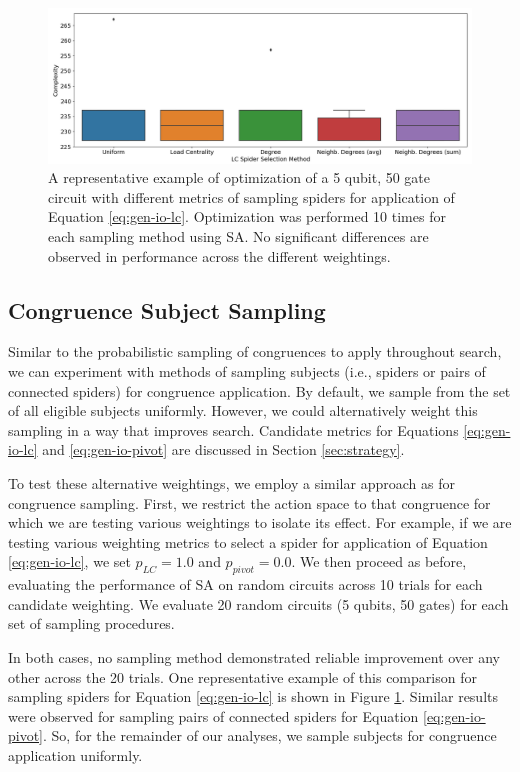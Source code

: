 \begin{figure}[t]
\centering
\includegraphics[width=13cm]{img/subj-sampling-ex.png}
\caption{
  A representative example of optimization of a 5 qubit, 50 gate circuit with different metrics of sampling spiders for application of Equation \ref{eq:gen-io-lc}.
  Optimization was performed 10 times for each sampling method using SA.
  No significant differences are observed in performance across the different weightings.
}
\label{fig:subj-sampling}
\end{figure}


\subsection*{Congruence Subject Sampling}

Similar to the probabilistic sampling of congruences to apply throughout search, we can experiment with methods of sampling subjects (i.e., spiders or pairs of connected spiders) for congruence application.
By default, we sample from the set of all eligible subjects uniformly.
However, we could alternatively weight this sampling in a way that improves search.
Candidate metrics for Equations \ref{eq:gen-io-lc} and \ref{eq:gen-io-pivot} are discussed in Section \ref{sec:strategy}.

To test these alternative weightings, we employ a similar approach as for congruence sampling.
First, we restrict the action space to that congruence for which we are testing various weightings to isolate its effect.
For example, if we are testing various weighting metrics to select a spider for application of Equation \ref{eq:gen-io-lc}, we set $p_{LC} = 1.0$ and $p_{pivot} = 0.0$.
We then proceed as before, evaluating the performance of SA on random circuits across 10 trials for each candidate weighting.
We evaluate 20 random circuits (5 qubits, 50 gates) for each set of sampling procedures.

In both cases, no sampling method demonstrated reliable improvement over any other across the 20 trials.
One representative example of this comparison for sampling spiders for Equation \ref{eq:gen-io-lc} is shown in Figure \ref{fig:subj-sampling}.
Similar results were observed for sampling pairs of connected spiders for Equation \ref{eq:gen-io-pivot}.
So, for the remainder of our analyses, we sample subjects for congruence application uniformly.

